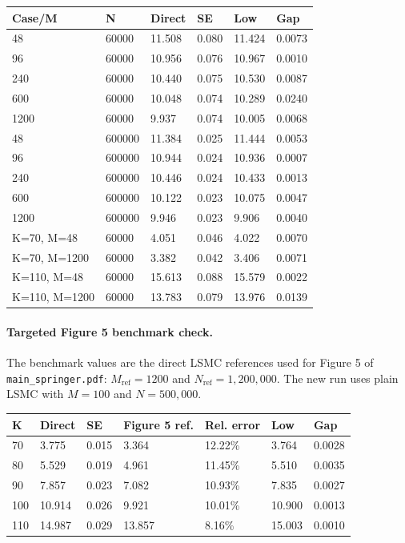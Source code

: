 \documentclass{article}
\begin{document}
\begin{tabular}{llllll}
\toprule
Case/M & N & Direct & SE & Low & Gap \\
\midrule
48 & 60000 & 11.508 & 0.080 & 11.424 & 0.0073 \\
96 & 60000 & 10.956 & 0.076 & 10.967 & 0.0010 \\
240 & 60000 & 10.440 & 0.075 & 10.530 & 0.0087 \\
600 & 60000 & 10.048 & 0.074 & 10.289 & 0.0240 \\
1200 & 60000 & 9.937 & 0.074 & 10.005 & 0.0068 \\
48 & 600000 & 11.384 & 0.025 & 11.444 & 0.0053 \\
96 & 600000 & 10.944 & 0.024 & 10.936 & 0.0007 \\
240 & 600000 & 10.446 & 0.024 & 10.433 & 0.0013 \\
600 & 600000 & 10.122 & 0.023 & 10.075 & 0.0047 \\
1200 & 600000 & 9.946 & 0.023 & 9.906 & 0.0040 \\
K=70, M=48 & 60000 & 4.051 & 0.046 & 4.022 & 0.0070 \\
K=70, M=1200 & 60000 & 3.382 & 0.042 & 3.406 & 0.0071 \\
K=110, M=48 & 60000 & 15.613 & 0.088 & 15.579 & 0.0022 \\
K=110, M=1200 & 60000 & 13.783 & 0.079 & 13.976 & 0.0139 \\
\bottomrule
\end{tabular}

\paragraph{Targeted Figure 5 benchmark check.}
The benchmark values are the direct LSMC references used for Figure 5 of \texttt{main\_springer.pdf}: $M_{\mathrm{ref}}=1200$ and $N_{\mathrm{ref}}=1{,}200{,}000$. The new run uses plain LSMC with $M=100$ and $N=500{,}000$.

\begin{tabular}{lllllll}
\toprule
K & Direct & SE & Figure 5 ref. & Rel. error & Low & Gap \\
\midrule
70 & 3.775 & 0.015 & 3.364 & 12.22\% & 3.764 & 0.0028 \\
80 & 5.529 & 0.019 & 4.961 & 11.45\% & 5.510 & 0.0035 \\
90 & 7.857 & 0.023 & 7.082 & 10.93\% & 7.835 & 0.0027 \\
100 & 10.914 & 0.026 & 9.921 & 10.01\% & 10.900 & 0.0013 \\
110 & 14.987 & 0.029 & 13.857 & 8.16\% & 15.003 & 0.0010 \\
\bottomrule
\end{tabular}
\end{document}
